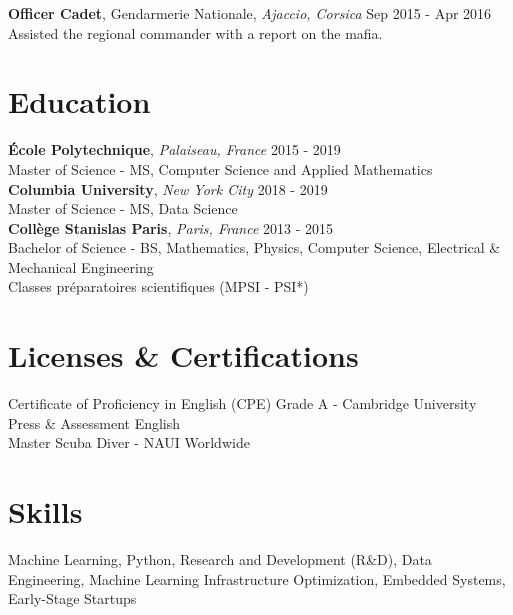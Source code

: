 \documentclass[a4paper,10pt]{article}
\begin{document}
    \noindent\textbf{Officer Cadet}, Gendarmerie Nationale, \textit{Ajaccio, Corsica} \hfill Sep 2015 - Apr 2016\\
    Assisted the regional commander with a report on the mafia.

    \section*{Education}
    \noindent\textbf{École Polytechnique}, \textit{Palaiseau, France} \hfill 2015 - 2019\\
    Master of Science - MS, Computer Science and Applied Mathematics\\

    \noindent\textbf{Columbia University}, \textit{New York City} \hfill 2018 - 2019\\
    Master of Science - MS, Data Science\\

    \noindent\textbf{Collège Stanislas Paris}, \textit{Paris, France} \hfill 2013 - 2015\\
    Bachelor of Science - BS, Mathematics, Physics, Computer Science, Electrical \& Mechanical Engineering\\
    Classes préparatoires scientifiques (MPSI - PSI*)

    \section*{Licenses \& Certifications}
    Certificate of Proficiency in English (CPE) Grade A - Cambridge University Press \& Assessment English \hfill \\
    Master Scuba Diver - NAUI Worldwide \hfill

    \section*{Skills}
    Machine Learning, Python, Research and Development (R\&D), Data Engineering, Machine Learning Infrastructure Optimization, Embedded Systems, Early-Stage Startups
\end{document}
